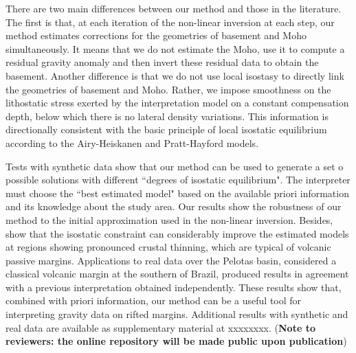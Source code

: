 \documentclass[manuscript]{geophysics}
\begin{document}
There are two main differences between our method and those in the literature.
The first is that, at each iteration of the non-linear inversion at each step, 
our method estimates corrections for the geometries of basement and Moho simultaneously. 
It means that we do not estimate the Moho, use it to compute a residual gravity anomaly
and then invert these residual data to obtain the basement.
Another difference is that we do not use local isostasy to directly link
the geometries of basement and Moho.
Rather, we impose smoothness on the lithostatic stress exerted by the interpretation 
model on a constant compensation depth, below which there is no lateral density variations.
This information is directionally consistent with the basic principle of 
local isostatic equilibrium according to the Airy-Heiskanen and Pratt-Hayford models.

Tests with synthetic data show that our method can be used to generate a set o possible 
solutions with different ``degrees of isostatic equilibrium". 
The interpreter must choose the ``best estimated model" based on the available priori 
information and its knowledge about the study area.
Our results show the robustness of our method to the initial approximation
used in the non-linear inversion. Besides, show that 
the isostatic constraint can considerably improve 
the estimated models at regions showing pronounced crustal thinning, which 
are typical of volcanic passive margins. 
Applications to real data over the Pelotas basin, considered a classical volcanic
margin at the southern of Brazil, produced results in agreement with a previous 
interpretation obtained independently.
These results show that, combined with priori information, our method can be a 
useful tool for interpreting gravity data on rifted margins.
Additional results with synthetic and real data are available as supplementary material at xxxxxxxx.
(\textbf{Note to reviewers: the online repository will be made public upon publication})
\end{document}
